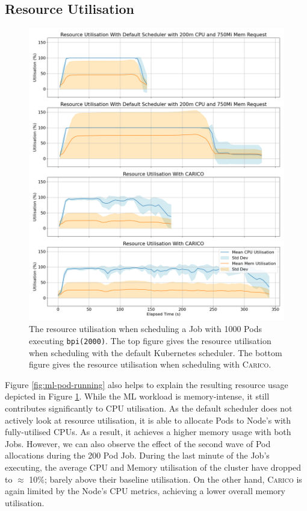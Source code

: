 \subsection{Resource Utilisation}
\begin{figure}[ht!]
    \centering
    \includegraphics[width=\textwidth]{images/ml-util.png}
    \caption{The resource utilisation when scheduling a Job with 1000 Pods
    executing \texttt{bpi(2000)}. The top figure gives the resource utilisation
    when scheduling with the default Kubernetes scheduler. The bottom figure
    gives the resource utilisation when scheduling with \textsc{Carico}.}
    \label{fig:ml-util}
\end{figure}

Figure \ref{fig:ml-pod-running} also helps to explain the resulting resource usage
depicted in Figure \ref{fig:ml-util}. While the ML workload is memory-intense,
it still contributes significantly to CPU utilisation. As the default scheduler
does not actively look at resource utilisation, it is able to allocate Pods to
Node's with fully-utilised CPUs. As a result, it achieves a higher memory usage
with both Jobs. However, we can also observe the effect of the second wave of
Pod allocations during the 200 Pod Job. During the last minute of the Job's
executing, the average CPU and Memory utilisation of the cluster have dropped to
$\approx$ 10\%; barely above their baseline utilisation.
On the other hand, \textsc{Carico} is again limited by the Node's CPU metrics, achieving
a lower overall memory utilisation.

